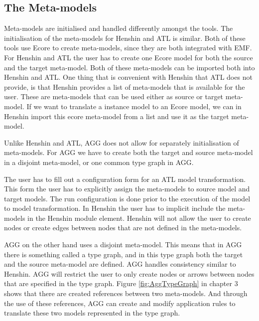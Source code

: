 \subsection{The Meta-models}
Meta-models are initialised and handled differently amongst the tools.
The initialisation of the meta-models for Henshin and ATL is similar. Both of
these tools use Ecore to create meta-models, since they are both integrated with
EMF. For Henshin and ATL the user has to create one Ecore model for both the
source and the target meta-model. Both of these meta-models can be imported both
into Henshin and ATL. One thing that is convenient with Henshin that ATL does
not provide, is that Henshin provides a list of meta-models that is available
for the user. These are meta-models that can be used either as source or target
meta-model. If we want to translate a instance model to an Ecore model, we can
in Henshin import this ecore meta-model from a list and use it as the target meta-model.

Unlike Henshin and ATL, AGG does not allow for separately initialisation of
meta-models. For AGG we have to create both the target and source meta-model in a
disjoint meta-model, or one common type graph in AGG.

The user has to fill out a configuration form for an ATL model transformation.
This form the user has to explicitly assign the meta-models to source model and
target models. The run configuration is done prior to the execution of the model
to model transformation. In Henshin the user has to implicit include the
meta-models in the Henshin module element. Henshin will not allow the user to
create nodes or create edges between nodes that are not defined in the
meta-models. 

AGG on the other hand uses a disjoint meta-model. This means that in AGG there
is something called a type graph, and in this type graph both the target and
the source meta-model are defined. AGG handles consistency similar to
Henshin. AGG will restrict the user to only create nodes or arrows between
nodes that are specified in the type graph. Figure \ref{fig:AggTypeGraph}
in chapter 3 shows that there are created references between two meta-models. And
through the use of these references, AGG can create and modify application
rules to translate these two models represented in the type graph. 
 
